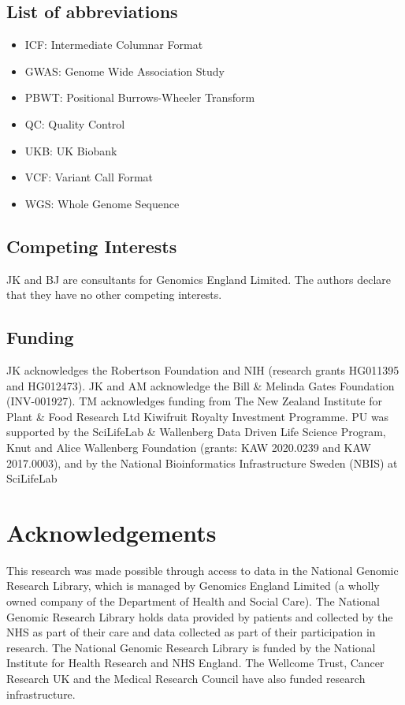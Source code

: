 \documentclass[a4paper,num-refs]{oup-contemporary}
\begin{document}
\subsection{List of abbreviations}

\begin{itemize}
    \item ICF: Intermediate Columnar Format
    \item GWAS: Genome Wide Association Study
    \item PBWT: Positional Burrows-Wheeler Transform
    \item QC: Quality Control
    \item UKB: UK Biobank
    \item VCF: Variant Call Format
    \item WGS: Whole Genome Sequence
\end{itemize}

\subsection{Competing Interests}
JK and BJ are consultants for Genomics England Limited.
The authors declare that they have no other competing interests.

\subsection{Funding}
JK acknowledges the Robertson Foundation and 
NIH (research grants HG011395 and HG012473). 
JK and AM acknowledge the Bill \& Melinda Gates Foundation (INV-001927).
TM acknowledges funding from The New Zealand Institute for Plant \& Food
Research Ltd Kiwifruit Royalty Investment Programme.
PU was supported by the SciLifeLab \& Wallenberg Data Driven Life
Science Program, Knut and Alice Wallenberg Foundation (grants: KAW
2020.0239 and KAW 2017.0003), and by the National Bioinformatics
Infrastructure Sweden (NBIS) at SciLifeLab

\section{Acknowledgements}
This research was made possible through access to data in the National Genomic
Research Library, which is managed by Genomics England Limited (a wholly owned
company of the Department of Health and Social Care). The National Genomic
Research Library holds data provided by patients and collected by the NHS as
part of their care and data collected as part of their participation in
research. The National Genomic Research Library is funded by the National
Institute for Health Research and NHS England. The Wellcome Trust, Cancer
Research UK and the Medical Research Council have also funded research
infrastructure.
\end{document}
